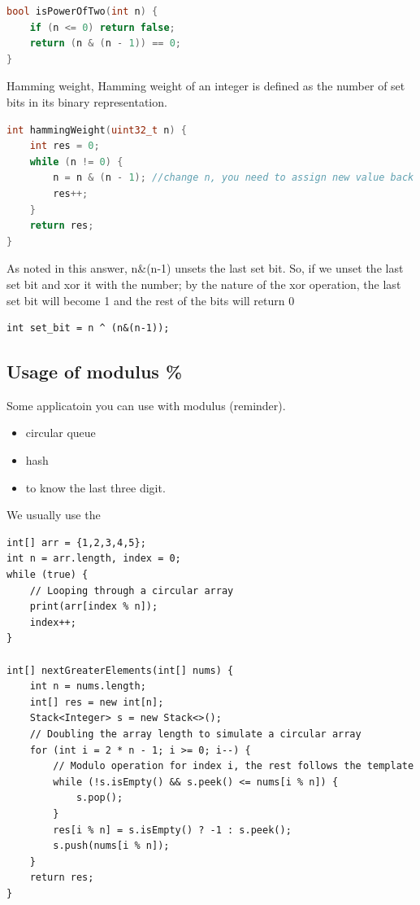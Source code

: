 \documentclass[a4paper,11pt,twoside]{book}
\begin{document}
\begin{lstlisting}[frame=single, language=c++]	
bool isPowerOfTwo(int n) {
	if (n <= 0) return false;
	return (n & (n - 1)) == 0;
}		
\end{lstlisting}	
	
	\par Hamming weight,  Hamming weight of an integer is defined as the number of set bits in its binary representation. 
\begin{lstlisting}[frame=single, language=c++]	
int hammingWeight(uint32_t n) {
	int res = 0;
	while (n != 0) {
		n = n & (n - 1); //change n, you need to assign new value back to n. 
		res++;
	}
	return res;
}	
\end{lstlisting}	

	\par As noted in this answer, n\&(n-1) unsets the last set bit.
So, if we unset the last set bit and xor it with the number; by the nature of the xor operation, the last set bit will become 1 and the rest of the bits will return 0
\begin{lstlisting}
int set_bit = n ^ (n&(n-1));
\end{lstlisting}


\subsection{Usage of modulus \%}

\par Some applicatoin you can use with modulus (reminder).
\begin{itemize}
\item circular queue
\item hash
\item to know the last three digit. 
\end{itemize}

We usually use the %
\begin{lstlisting}
int[] arr = {1,2,3,4,5};
int n = arr.length, index = 0;
while (true) {
	// Looping through a circular array
	print(arr[index % n]);
	index++;
}

int[] nextGreaterElements(int[] nums) {
	int n = nums.length;
	int[] res = new int[n];
	Stack<Integer> s = new Stack<>();
	// Doubling the array length to simulate a circular array
	for (int i = 2 * n - 1; i >= 0; i--) {
		// Modulo operation for index i, the rest follows the template
		while (!s.isEmpty() && s.peek() <= nums[i % n]) {
			s.pop();
		}
		res[i % n] = s.isEmpty() ? -1 : s.peek();
		s.push(nums[i % n]);
	}
	return res;
}	
\end{lstlisting}
\end{document}

